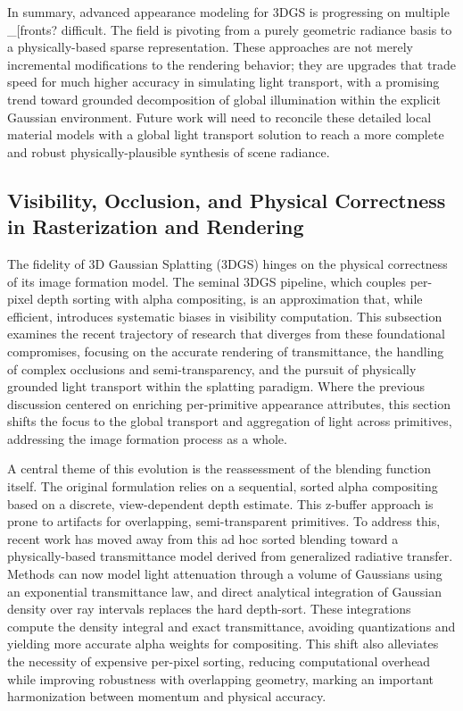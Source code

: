 \documentclass[11pt,a4paper]{article}
\begin{document}
In summary, advanced appearance modeling for 3DGS is progressing on multiple \_[fronts? difficult. The field is pivoting from a purely geometric radiance basis to a physically-based sparse representation. These approaches are not merely incremental modifications to the rendering behavior; they are upgrades that trade speed for much higher accuracy in simulating light transport, with a promising trend toward grounded decomposition of global illumination within the explicit Gaussian environment. Future work will need to reconcile these detailed local material models with a global light transport solution to reach a more complete and robust physically-plausible synthesis of scene radiance.


\subsection{Visibility, Occlusion, and Physical Correctness in Rasterization and Rendering}


The fidelity of 3D Gaussian Splatting (3DGS) hinges on the physical correctness of its image formation model. The seminal 3DGS pipeline, which couples per-pixel depth sorting with alpha compositing, is an approximation that, while efficient, introduces systematic biases in visibility computation. This subsection examines the recent trajectory of research that diverges from these foundational compromises, focusing on the accurate rendering of transmittance, the handling of complex occlusions and semi-transparency, and the pursuit of physically grounded light transport within the splatting paradigm. Where the previous discussion centered on enriching per-primitive appearance attributes, this section shifts the focus to the global transport and aggregation of light across primitives, addressing the image formation process as a whole.

A central theme of this evolution is the reassessment of the blending function itself. The original formulation relies on a sequential, sorted alpha compositing based on a discrete, view-dependent depth estimate. This z-buffer approach is prone to artifacts for overlapping, semi-transparent primitives. To address this, recent work has moved away from this ad hoc sorted blending toward a physically-based transmittance model derived from generalized radiative transfer. Methods can now model light attenuation through a volume of Gaussians using an exponential transmittance law, and direct analytical integration of Gaussian density over ray intervals replaces the hard depth-sort. These integrations compute the density integral and exact transmittance, avoiding quantizations and yielding more accurate alpha weights for compositing. This shift also alleviates the necessity of expensive per-pixel sorting, reducing computational overhead while improving robustness with overlapping geometry, marking an important harmonization between momentum and physical accuracy.
\end{document}
